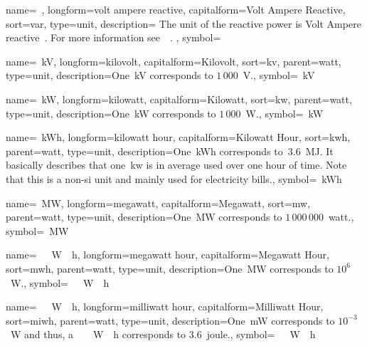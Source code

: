 {
    name={\protect\si{\protect\var}},
    longform={volt ampere reactive},
    capitalform={Volt Ampere Reactive},
    sort={var},
    type={unit},
    description={ The unit of the reactive power is Volt
    Ampere reactive~. For more information
    see~~.
    },
    symbol={\protect\si{\protect\var}}
}

{
    name={\protect\si{\protect\kV}},
    longform={kilovolt},
    capitalform={Kilovolt},
    sort={kv},
    parent={watt},
    type={unit},
    description={One~\si{\kV} corresponds to $1\,000$~\si{\volt}.},
    symbol={\protect\si{\protect\kV}}
}

{
    name={\protect\si{\protect\kW}},
    longform={kilowatt},
    capitalform={Kilowatt},
    sort={kw},
    parent={watt},
    type={unit},
    description={One~\si{\kW} corresponds to $1\,000$~\si{\watt}.},
    symbol={\protect\si{\protect\kW}}
}

{
    name={\protect\si{\protect\kWh}},
    longform={kilowatt hour},
    capitalform={Kilowatt Hour},
    sort={kwh},
    parent={watt},
    type={unit},
    description={One~\si{\kWh} corresponds to~$3.6$~\si{\mega\joule}. It
    basically describes that one~\gls{kw} is in average used over one hour of
    time. Note that this is a non-\gls{si} unit and mainly used for electricity
    bills.},
    symbol={\protect\si{\protect\kWh}}
}

{
    name={\protect\si{\protect\MW}},
    longform={megawatt},
    capitalform={Megawatt},
    sort={mw},
    parent={watt},
    type={unit},
    description={One~\si{\MW} corresponds to $1\,000\,000$~\gls{watt}.},
    symbol={\protect\si{\protect\MW}}
}

{
    name={\protect\si{\protect\mega\protect\watt\protect\hour}},
    longform={megawatt hour},
    capitalform={Megawatt Hour},
    sort={mwh},
    parent={watt},
    type={unit},
    description={One~\si{\mega\watt} corresponds to $10^{6}$~\si{\watt}.},
    symbol={\protect\si{\protect\mega\protect\watt\protect\hour}}
}

{
    name={\protect\si{\protect\milli\protect\watt\protect\hour}},
    longform={milliwatt hour},
    capitalform={Milliwatt Hour},
    sort={miwh},
    parent={watt},
    type={unit},
    description={One~\si{\milli\watt} corresponds to $10^{-3}$~\si{\watt} and
    thus, a~\si{\protect\milli\protect\watt\protect\hour} corresponds to
    3.6~\gls{joule}.},
    symbol={\protect\si{\protect\milli\protect\watt\protect\hour}}
}


